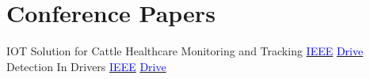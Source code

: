 \documentclass[a4paper,11pt]{article}
\begin{document}
\section{\textbf{Conference Papers}}
\begin{itemize}[leftmargin=0.05in, label={}]
    \small{\item{
        \textAn IOT Solution for Cattle Healthcare Monitoring and Tracking \href{https://ieeexplore.ieee.org/document/10053837}{\textcolor{blue}{IEEE}} \href{https://drive.google.com/file/d/15noMKYeeE6e6Ujh-8jzR2arvV1OHwCUP/view?usp=drive_link}{\textcolor{blue}{Drive}} \\ %
        \textDrowsiness Detection In Drivers \href{https://ieeexplore.ieee.org/document/10431259}{\textcolor{blue}{IEEE}} \href{https://drive.google.com/file/d/1L-rdg8BdFRRNphkvO3UFX1wTpGS6BvXK/view?usp=sharing}{\textcolor{blue}{Drive}} \\ %
    }}
\end{itemize}
\vspace{-6.5mm}
\end{document}
